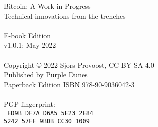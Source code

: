 \newpage
{\setlength{\parindent}{0cm}
\begin{vplace}
Bitcoin: A Work in Progress\\
Technical innovations from the trenches\\
\\
E-book Edition\\
v1.0.1: May 2022\\
\\
Copyright © 2022 Sjors Provoost, CC BY-SA 4.0\\
Published by Purple Dunes\\
Paperback Edition ISBN 978-90-9036042-3\\


\\

PGP fingerprint:\\
\texttt{
ED9B DF7A D6A5 5E23 2E84\\
5242 57FF 9BDB CC30 1009\\
}

\end{vplace}
}
